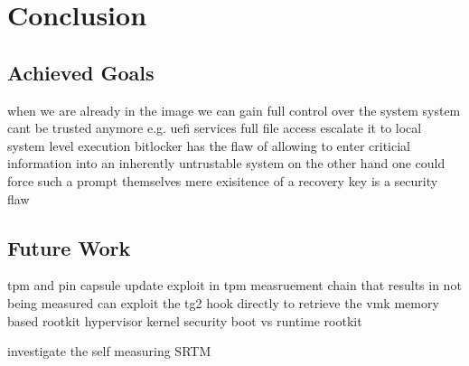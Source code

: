 
\chapter{Conclusion}


\section{Achieved Goals}
when we are already in the image we can gain full control over the system
system cant be trusted anymore e.g. uefi services
full file access
escalate it to local system level execution
bitlocker has the flaw of allowing to enter criticial information into an inherently untrustable system
on the other hand one could force such a prompt themselves
mere exisitence of a recovery key is a security flaw

\section{Future Work}
tpm and pin
capsule update
exploit in tpm measruement chain that results in not being measured
can exploit the tg2 hook directly to retrieve the vmk
memory based rootkit
hypervisor kernel security
boot vs runtime rootkit

investigate the self measuring \ac{SRTM}